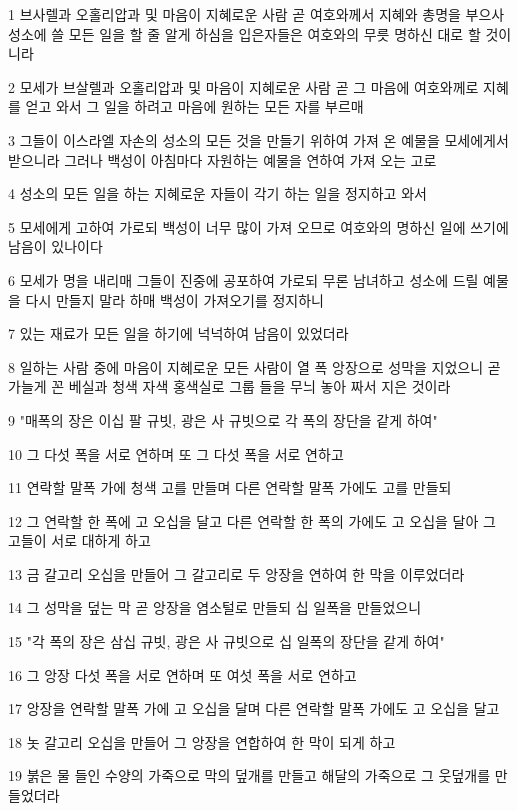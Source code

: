 \par 1 브사렐과 오홀리압과 및 마음이 지혜로운 사람 곧 여호와께서 지혜와 총명을 부으사 성소에 쓸 모든 일을 할 줄 알게 하심을 입은자들은 여호와의 무릇 명하신 대로 할 것이니라
\par 2 모세가 브살렐과 오홀리압과 및 마음이 지혜로운 사람 곧 그 마음에 여호와께로 지혜를 얻고 와서 그 일을 하려고 마음에 원하는 모든 자를 부르매
\par 3 그들이 이스라엘 자손의 성소의 모든 것을 만들기 위하여 가져 온 예물을 모세에게서 받으니라 그러나 백성이 아침마다 자원하는 예물을 연하여 가져 오는 고로
\par 4 성소의 모든 일을 하는 지혜로운 자들이 각기 하는 일을 정지하고 와서
\par 5 모세에게 고하여 가로되 백성이 너무 많이 가져 오므로 여호와의 명하신 일에 쓰기에 남음이 있나이다
\par 6 모세가 명을 내리매 그들이 진중에 공포하여 가로되 무론 남녀하고 성소에 드릴 예물을 다시 만들지 말라 하매 백성이 가져오기를 정지하니
\par 7 있는 재료가 모든 일을 하기에 넉넉하여 남음이 있었더라
\par 8 일하는 사람 중에 마음이 지혜로운 모든 사람이 열 폭 앙장으로 성막을 지었으니 곧 가늘게 꼰 베실과 청색 자색 홍색실로 그룹 들을 무늬 놓아 짜서 지은 것이라
\par 9 "매폭의 장은 이십 팔 규빗, 광은 사 규빗으로 각 폭의 장단을 같게 하여"
\par 10 그 다섯 폭을 서로 연하며 또 그 다섯 폭을 서로 연하고
\par 11 연락할 말폭 가에 청색 고를 만들며 다른 연락할 말폭 가에도 고를 만들되
\par 12 그 연락할 한 폭에 고 오십을 달고 다른 연락할 한 폭의 가에도 고 오십을 달아 그 고들이 서로 대하게 하고
\par 13 금 갈고리 오십을 만들어 그 갈고리로 두 앙장을 연하여 한 막을 이루었더라
\par 14 그 성막을 덮는 막 곧 앙장을 염소털로 만들되 십 일폭을 만들었으니
\par 15 "각 폭의 장은 삼십 규빗, 광은 사 규빗으로 십 일폭의 장단을 같게 하여"
\par 16 그 앙장 다섯 폭을 서로 연하며 또 여섯 폭을 서로 연하고
\par 17 앙장을 연락할 말폭 가에 고 오십을 달며 다른 연락할 말폭 가에도 고 오십을 달고
\par 18 놋 갈고리 오십을 만들어 그 앙장을 연합하여 한 막이 되게 하고
\par 19 붉은 물 들인 수양의 가죽으로 막의 덮개를 만들고 해달의 가죽으로 그 웃덮개를 만들었더라
